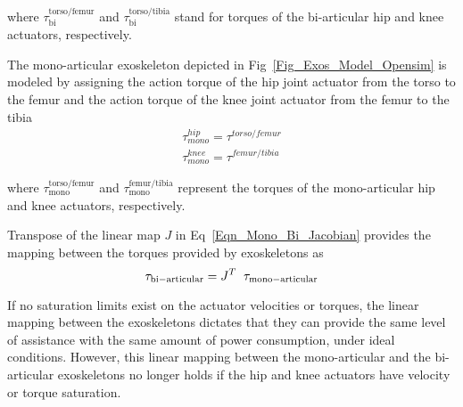 \documentclass[10pt,letterpaper]{article}
\begin{document}
\noindent where ${{\tau_{\mathrm{bi}}^{\mathrm{torso}/\mathrm{femur}} }}$ and ${{\tau_{\mathrm{bi}}^{\mathrm{torso}/\mathrm{tibia}} }}$ stand for torques of the bi-articular hip and knee actuators, respectively.

\begin{figure*}[b!]
	\centering
	\hfil
	\vspace{1mm}
	\caption{\small{\textbf{Assistive actuator model of assistive devices.} The blue and red arrows represent the action and reaction torques of the assistive actuators on the assistive devices, respectively.}} %
	\label{Fig_Exos_Model_Opensim}
\end{figure*}


The mono-articular exoskeleton depicted in Fig~\ref{Fig_Exos_Model_Opensim}  is modeled by assigning the action torque of the hip joint actuator from the torso to the femur and the action torque of the knee joint actuator  from the femur to the tibia
%
\begin{eqnarray}\label{Eqn_monoarticular_Torque_Act}
\tau^{hip}_{mono} = \tau^{torso/femur} \nonumber\\
\tau^{knee}_{mono} = \tau^{femur/tibia}\nonumber
\end{eqnarray}

\noindent  where  ${{\tau_{\mathrm{mono}}^{\mathrm{torso}/\mathrm{femur}} }}$ and ${{\tau_{\mathrm{mono}}^{\mathrm{femur}/\mathrm{tibia}} }}$ represent the torques of the mono-articular hip and knee actuators, respectively.


Transpose of the linear map $J$ in Eq~\eqref{Eqn_Mono_Bi_Jacobian} provides the mapping  between the torques provided by exoskeletons as
%
\begin{equation}\label{Mono_Bi_Torque_Mapping}
\tau_{\mathrm{bi-articular}} =J^T \hspace{2mm} \tau_{\mathrm{mono-articular}}
\end{equation}
%

If no saturation limits exist on the actuator velocities or torques, the linear mapping between the exoskeletons dictates that they can provide the same level of assistance with the same amount of power consumption, under ideal conditions. However, this linear mapping between the mono-articular and the bi-articular exoskeletons no longer holds if the hip and knee actuators have velocity or torque saturation.
\end{document}
